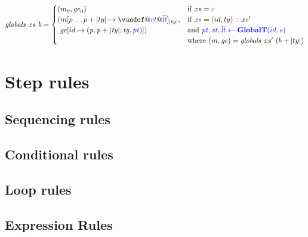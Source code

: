 \documentclass[acmsmall,review,anonymous]{acmart}\settopmatter{printfolios=true,printccs=false,printacmref=false}
\begin{document}

\[\mathit{globals} ~ xs ~ b =
\begin{cases}
  (\mem_0, \genv_0) & \textnormal{if } xs = \varepsilon \\
  (\mem[p \dots p+|ty| \mapsto \vundef@\vt@\overline{\lt}]_{|ty|}, & \textnormal{if } xs = (id,ty)::xs' \\
  ~ \genv[id \mapsto (\mathit{p, p+|ty|,ty,\pt})]) & \textnormal{and } \trule{\globaltres}{\globalt} \\
  & \textnormal{where } (\mem,\genv) = \mathit{globals} ~ xs' ~ (b + |ty|) \\
\end{cases}\]

\section{Step rules}
\label{app:rules}

\subsection{Sequencing rules}

  \dostepa
  \dostepb
  \seqstep
  \seqskipstep
  \seqcontinuestep
  \seqbreakstep


\subsection{Conditional rules}

  \ifstepa
  \ifstepb
  \switchcontinuestep

\subsection{Loop rules}

\loops

\subsection{Expression Rules}

\mallocstep
\valofstep
\assignopstep
\postincstep
\assignstep
\varstep
\unopstep
\binopstep
\callexprstep
\end{document}
